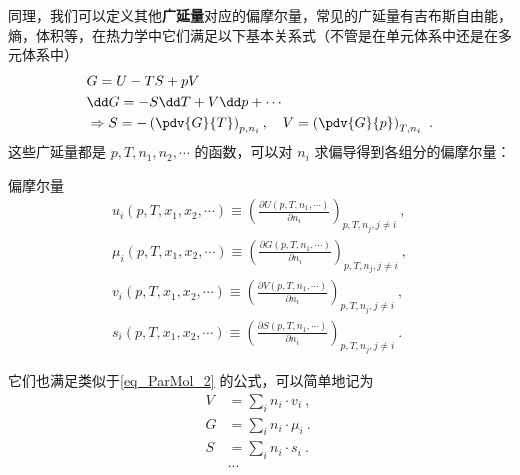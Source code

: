 同理，我们可以定义其他\textbf{广延量}对应的偏摩尔量，常见的广延量有吉布斯自由能，熵，体积等，在热力学中它们满足以下基本关系式（不管是在单元体系中还是在多元体系中）
\begin{equation}\label{eq_ParMol_3}
\begin{aligned}
&G=U-TS+pV\\
&\dd G=-S\dd T+V\dd p+\cdots\\
&\Rightarrow S=-\left(\pdv{G}{T}\right)_{p,n_i},\quad V=\left(\pdv{G}{p}\right)_{T,n_i}~.
\end{aligned}
\end{equation}
这些广延量都是 $p,T,n_1,n_2,\cdots$ 的函数，可以对 $n_i$ 求偏导得到各组分的偏摩尔量：
\begin{definition}{偏摩尔量}
\begin{equation}\label{eq_ParMol_4}
\begin{aligned}
u_i(p,T,x_1,x_2,\cdots )\equiv \left(\frac{\partial U(p,T,n_1,\cdots)}{\partial n_i}\right)_{p,T,n_j,j\neq i}~,\\
\mu_i(p,T,x_1,x_2,\cdots )\equiv \left(\frac{\partial G(p,T,n_1,\cdots)}{\partial n_i}\right)_{p,T,n_j,j\neq i}~,\\
v_i(p,T,x_1,x_2,\cdots )\equiv \left(\frac{\partial V(p,T,n_1,\cdots)}{\partial n_i}\right)_{p,T,n_j,j\neq i}~,\\
s_i(p,T,x_1,x_2,\cdots )\equiv \left(\frac{\partial S(p,T,n_1,\cdots)}{\partial n_i}\right)_{p,T,n_j,j\neq i}~.
\end{aligned}
\end{equation}
\end{definition}
它们也满足类似于\autoref{eq_ParMol_2} 的公式，可以简单地记为
\begin{equation}
\begin{aligned}
V &= \sum_i  n_i \cdot v_i ~,\\
G &= \sum_i  n_i \cdot \mu_i~.\\
S &= \sum_i  n_i \cdot s_i~.\\
&...\\
\end{aligned}~
\end{equation}
